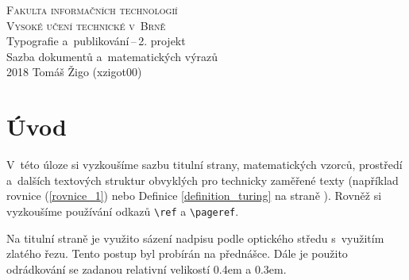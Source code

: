 \documentclass[a4paper,11pt,twocolumn]{article}
\theoremstyle{definition}
\begin{document}
\begin{titlepage}
\begin{center}
\textsc{\Huge Fakulta informačních technologií\\[0.3em]
Vysoké učení technické v~Brně}\\
\LARGE Typografie a~publikování\,--\,2. projekt\\[0.4em]
Sazba dokumentů a~matematických výrazů\\
\Large 2018 \hfill         Tomáš Žigo (xzigot00)\newpage
\end{center}
\end{titlepage}

\section*{Úvod}
V~této úloze si vyzkoušíme sazbu titulní strany, matematic\-kých
vzorců, prostředí a~dalších textových struktur obvyklých
pro technicky zaměřené texty (například rovnice (\ref{rovnice_1})
nebo Definice 	\ref{definition_turing} na straně \pageref{definition_turing}). Rovněž si vyzkoušíme používání
odkazů \verb|\ref| a \verb|\pageref|.

Na titulní straně je využito sázení nadpisu podle optického
středu s~využitím zlatého řezu. Tento postup byl
probírán na přednášce. Dále je použito odrádkování se
zadanou relativní velikostí 0.4em a 0.3em.
\end{document}
